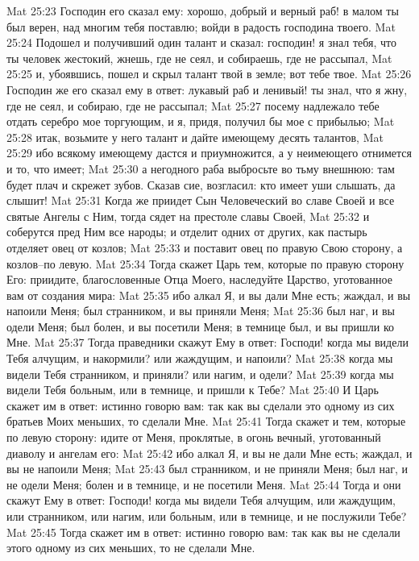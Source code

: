 Mat 25:23  Господин его сказал ему: хорошо, добрый и верный раб! в малом ты был верен, над многим тебя поставлю; войди в радость господина твоего.
Mat 25:24  Подошел и получивший один талант и сказал: господин! я знал тебя, что ты человек жестокий, жнешь, где не сеял, и собираешь, где не рассыпал,
Mat 25:25  и, убоявшись, пошел и скрыл талант твой в земле; вот тебе твое.
Mat 25:26  Господин же его сказал ему в ответ: лукавый раб и ленивый! ты знал, что я жну, где не сеял, и собираю, где не рассыпал;
Mat 25:27  посему надлежало тебе отдать серебро мое торгующим, и я, придя, получил бы мое с прибылью;
Mat 25:28  итак, возьмите у него талант и дайте имеющему десять талантов,
Mat 25:29  ибо всякому имеющему дастся и приумножится, а у неимеющего отнимется и то, что имеет;
Mat 25:30  а негодного раба выбросьте во тьму внешнюю: там будет плач и скрежет зубов. Сказав сие, возгласил: кто имеет уши слышать, да слышит!
Mat 25:31  Когда же приидет Сын Человеческий во славе Своей и все святые Ангелы с Ним, тогда сядет на престоле славы Своей,
Mat 25:32  и соберутся пред Ним все народы; и отделит одних от других, как пастырь отделяет овец от козлов;
Mat 25:33  и поставит овец по правую Свою сторону, а козлов--по левую.
Mat 25:34  Тогда скажет Царь тем, которые по правую сторону Его: приидите, благословенные Отца Моего, наследуйте Царство, уготованное вам от создания мира:
Mat 25:35  ибо алкал Я, и вы дали Мне есть; жаждал, и вы напоили Меня; был странником, и вы приняли Меня;
Mat 25:36  был наг, и вы одели Меня; был болен, и вы посетили Меня; в темнице был, и вы пришли ко Мне.
Mat 25:37  Тогда праведники скажут Ему в ответ: Господи! когда мы видели Тебя алчущим, и накормили? или жаждущим, и напоили?
Mat 25:38  когда мы видели Тебя странником, и приняли? или нагим, и одели?
Mat 25:39  когда мы видели Тебя больным, или в темнице, и пришли к Тебе?
Mat 25:40  И Царь скажет им в ответ: истинно говорю вам: так как вы сделали это одному из сих братьев Моих меньших, то сделали Мне.
Mat 25:41  Тогда скажет и тем, которые по левую сторону: идите от Меня, проклятые, в огонь вечный, уготованный диаволу и ангелам его:
Mat 25:42  ибо алкал Я, и вы не дали Мне есть; жаждал, и вы не напоили Меня;
Mat 25:43  был странником, и не приняли Меня; был наг, и не одели Меня; болен и в темнице, и не посетили Меня.
Mat 25:44  Тогда и они скажут Ему в ответ: Господи! когда мы видели Тебя алчущим, или жаждущим, или странником, или нагим, или больным, или в темнице, и не послужили Тебе?
Mat 25:45  Тогда скажет им в ответ: истинно говорю вам: так как вы не сделали этого одному из сих меньших, то не сделали Мне.
